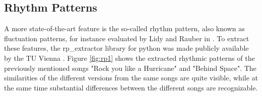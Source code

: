 \subsection{Rhythm Patterns}\label{flucpat}

A more state-of-the-art feature is the so-called rhythm pattern, also known as fluctuation patterns, for instance evaluated by Lidy and Rauber in \cite{rp1}. 
To extract these features, the rp\_extractor library for python \cite{rp_extract} was made publicly available by the TU Vienna \cite{rp_extract2}. Figure \ref{fig:rp1} shows the extracted rhythmic patterns of the previously mentioned songs "Rock you like a Hurricane" and "Behind Space". The similarities of the different versions from the same songs are quite visible, while at the same time substantial differences between the different songs are recognizable.

